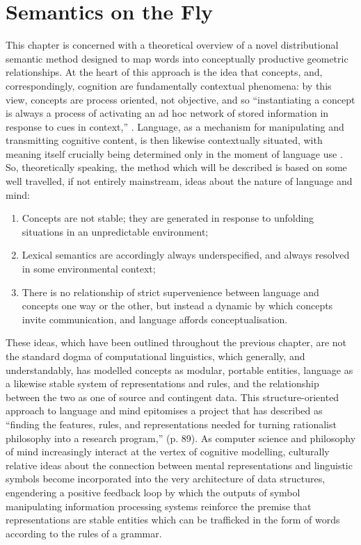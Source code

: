 \chapter{Semantics on the Fly} \label{chap:theory}
This chapter is concerned with a theoretical overview of a novel distributional semantic method designed to map words into conceptually productive geometric relationships.  At the heart of this approach is the idea that concepts, and, correspondingly, cognition are fundamentally contextual phenomena: by this view, concepts are process oriented, not objective, and so ``instantiating a concept is always a process of activating an ad hoc network of stored information in response to cues in context,'' \citep[][p. 546]{Casasanto2015}.  Language, as a mechanism for manipulating and transmitting cognitive content, is then likewise contextually situated, with meaning itself crucially being determined only in the moment of language use \citep{Evans2009}.  So, theoretically speaking, the method which will be described is based on some well travelled, if not entirely mainstream, ideas about the nature of language and mind:

\begin{enumerate}
\item{Concepts are not stable; they are generated in response to unfolding situations in an unpredictable environment;}
\item{Lexical semantics are accordingly always underspecified, and always resolved in some environmental context;}
\item{There is no relationship of strict supervenience between language and concepts one way or the other, but instead a dynamic by which concepts invite communication, and language affords conceptualisation.}
\end{enumerate}

These ideas, which have been outlined throughout the previous chapter, are not the standard dogma of computational linguistics, which generally, and understandably, has modelled concepts as modular, portable entities, language as a likewise stable system of representations and rules, and the relationship between the two as one of source and contingent data.  This structure-oriented approach to language and mind epitomises a project that \cite{Dreyfus2012} has described as ``finding the features, rules, and representations needed for turning rationalist philosophy into a research program,'' (p. 89).  As computer science and philosophy of mind increasingly interact at the vertex of cognitive modelling, culturally relative ideas about the connection between mental representations and linguistic symbols become incorporated into the very architecture of data structures, engendering a positive feedback loop by which the outputs of symbol manipulating information processing systems reinforce the premise that representations are stable entities which can be trafficked in the form of words according to the rules of a grammar.

